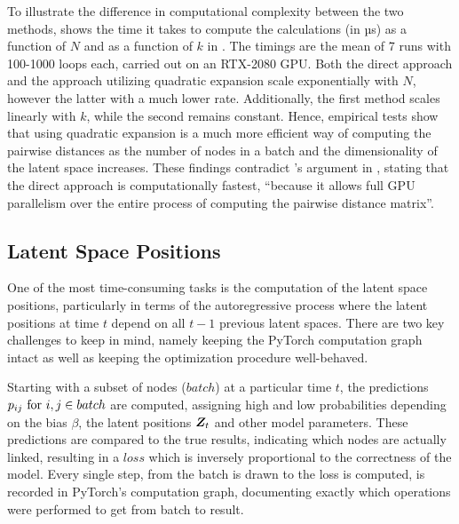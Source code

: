     To illustrate the difference in computational complexity between the two methods,  shows the time it takes to compute the calculations (in µs) as a function of $N$ and as a function of $k$ in . The timings are the mean of 7 runs with 100-1000 loops each, carried out on an RTX-2080 GPU. Both the direct approach and the approach utilizing quadratic expansion scale exponentially with $N$, however the latter with a much lower rate. Additionally, the first method scales linearly with $k$, while the second remains constant. Hence, empirical tests show that using quadratic expansion is a much more efficient way of computing the pairwise distances as the number of nodes in a batch and the dimensionality of the latent space increases. These findings contradict \citeauthor{jacobsen2018a}'s argument in \cite{jacobsen2018a}, stating that the direct approach is computationally fastest, ``because it allows full GPU parallelism over the entire process of computing the pairwise distance matrix''.
    
\subsection{Latent Space Positions}\label{sec:pyimpl-positions}

    One of the most time-consuming tasks is the computation of the latent space positions, particularly in terms of the autoregressive process where the latent positions at time $t$ depend on all $t-1$ previous latent spaces.
    There are two key challenges to keep in mind, namely keeping the PyTorch computation graph intact as well as keeping the optimization procedure well-behaved. 
    
    Starting with a subset of nodes ($batch$) at a particular time $t$, the predictions $\sub(p)\text{ for } i,j \in batch$ are computed, assigning high and low probabilities depending on the bias $\beta$, the latent positions $\bm{Z}_t$ and other model parameters. These predictions are compared to the true results, indicating which nodes are actually linked, resulting in a $loss$ which is inversely proportional to the correctness of the model. Every single step, from the batch is drawn to the loss is computed, is recorded in PyTorch's computation graph, documenting exactly which operations were performed to get from batch to result. 
    
